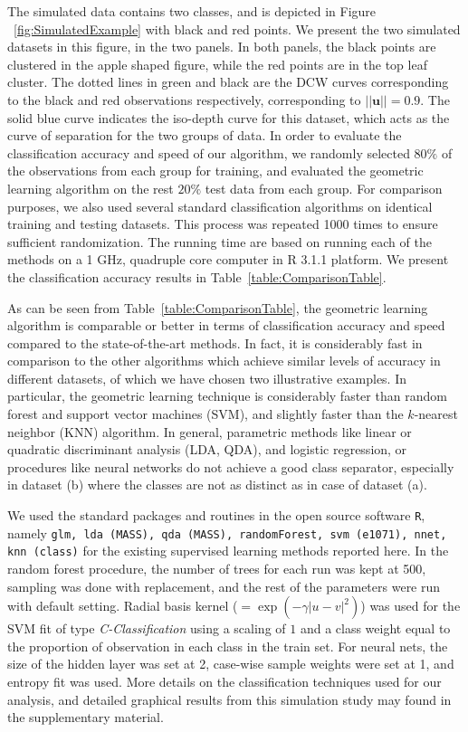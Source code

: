 \documentclass[twoside]{article}
\begin{document}
The simulated data contains two classes, and is depicted in 
Figure ~\ref{fig:SimulatedExample} with black and red points.  
We present the two simulated datasets in this figure, in the two panels.
In both panels, the black points are clustered in the apple shaped figure, while 
 the red points are in the top leaf cluster. The dotted lines in green and black 
 are the DCW curves corresponding to the black and red observations respectively, 
 corresponding to $|| \mathbf{u} || = 0.9$. The solid blue curve indicates the 
 iso-depth curve for this dataset, which acts as the curve of separation for the 
 two groups of data. In order to evaluate the classification accuracy 
 and speed of our algorithm, we 
 randomly selected $80 \%$ of the observations from each group for training, 
 and evaluated the 
 geometric learning algorithm on the rest $20 \%$ test data from each group. 
 For comparison purposes, 
 we also used several standard classification algorithms on identical training 
 and testing datasets. 
  This process was repeated 1000 times to ensure sufficient randomization. 
The running time are based on running each of the methods on a 1 GHz, quadruple core computer in R 3.1.1 platform. We present the classification accuracy results in 
 Table~\ref{table:ComparisonTable}. 
 
  
 As can be seen from  Table~\ref{table:ComparisonTable}, the geometric learning algorithm 
is comparable or better in terms of classification accuracy and speed compared to the 
state-of-the-art methods. 
In fact, it is considerably fast in comparison to the other algorithms 
which achieve similar levels of accuracy in different datasets, of which we have 
chosen two illustrative examples. In particular, the geometric learning technique is 
considerably faster than random forest and support vector machines (SVM), and 
slightly faster than the $k$-nearest neighbor (KNN) algorithm. 
In general, parametric methods like linear or quadratic discriminant analysis (LDA, QDA), 
and logistic regression, or procedures like  neural networks do not achieve 
a good class separator, especially in dataset (b) where the classes are 
not as distinct as in case of dataset (a). 

We used the standard packages and routines in the open source software {\tt R}, namely 
{\tt glm, lda (MASS), qda (MASS), randomForest, svm (e1071), nnet, knn (class)}
for the existing supervised learning methods reported here. 
In the random forest procedure, the number of trees for each run was kept at 500, 
sampling was done with replacement, and the rest of the parameters 
were run with default setting. Radial basis kernel 
($ = \exp ( - \gamma | u - v |^2 ) $) was used for the SVM fit of type \textit{C-Classification} using a scaling of $1$ and a class weight 
equal to the proportion of observation in each class in the train set. 
For neural nets, the size of the hidden layer was set at 2, case-wise sample 
weights were set at 1, and entropy fit was used. 
More details on the classification techniques 
used for our analysis, and detailed graphical results from this simulation study may 
found in the supplementary material. 
\end{document}
